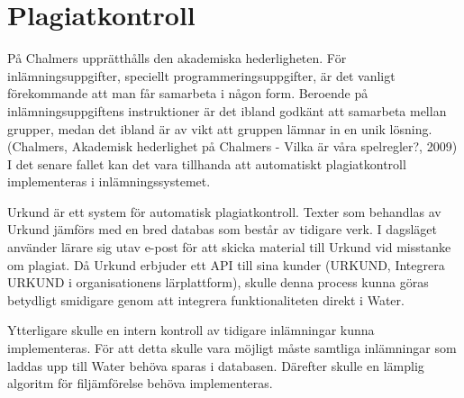 \section{Plagiatkontroll}
På Chalmers upprätthålls den akademiska hederligheten. För inlämningsuppgifter, speciellt programmeringsuppgifter, är det vanligt förekommande att man får samarbeta i någon form. Beroende på inlämningsuppgiftens instruktioner är det ibland godkänt att samarbeta mellan grupper, medan det ibland är av vikt att gruppen lämnar in en unik lösning. (Chalmers, Akademisk hederlighet på Chalmers - Vilka är våra spelregler?, 2009) I det senare fallet kan det vara tillhanda att automatiskt plagiatkontroll implementeras i inlämningssystemet.

Urkund är ett system för automatisk plagiatkontroll. Texter som behandlas av Urkund jämförs med en bred databas som består av tidigare verk. I dagsläget använder lärare sig utav e-post för att skicka material till Urkund vid misstanke om plagiat. Då Urkund erbjuder ett API till sina kunder (URKUND, Integrera URKUND i organisationens lärplattform), skulle denna process kunna göras betydligt smidigare genom att integrera funktionaliteten direkt i Water.

Ytterligare skulle en intern kontroll av tidigare inlämningar kunna implementeras. För att detta skulle vara möjligt måste samtliga inlämningar som laddas upp till Water behöva sparas i databasen. Därefter skulle en lämplig algoritm för filjämförelse behöva implementeras.
